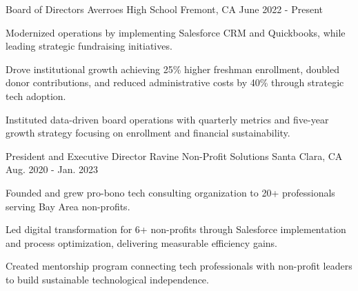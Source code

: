 
\renewcommand{\baselinestretch}{1.4} 
\begin{cventries}

  \cventry
  {Board of Directors} %
  {Averroes High School} %
  {Fremont, CA} %
  {June 2022 - Present} %
  {
    \begin{cvitems} %
      \item {Modernized operations by implementing Salesforce CRM and Quickbooks, while leading strategic fundraising initiatives.}
      \item {Drove institutional growth achieving 25\% higher freshman enrollment, doubled donor contributions, and reduced administrative costs by 40\% through strategic tech adoption.}
      \item {Instituted data-driven board operations with quarterly metrics and five-year growth strategy focusing on enrollment and financial sustainability.}
    \end{cvitems}
  }

  \cventry
    {President and Executive Director} %
    {Ravine Non-Profit Solutions} %
    {Santa Clara, CA} %
    {Aug. 2020 - Jan. 2023} %
    {
      \begin{cvitems} %
        \item {Founded and grew pro-bono tech consulting organization to 20+ professionals serving Bay Area non-profits.}
        \item {Led digital transformation for 6+ non-profits through Salesforce implementation and process optimization, delivering measurable efficiency gains.}
        \item {Created mentorship program connecting tech professionals with non-profit leaders to build sustainable technological independence.}
      \end{cvitems}
    }

\end{cventries}
